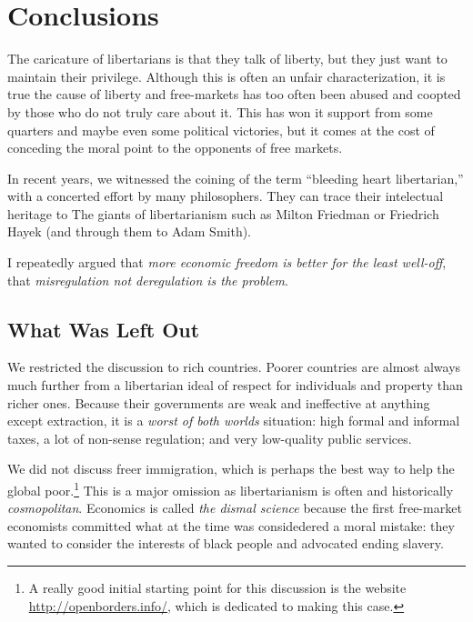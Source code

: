\chapter{Conclusions}

The caricature of libertarians is that they talk of liberty, but they just want
to maintain their privilege. Although this is often an unfair characterization,
it is true the cause of liberty and free-markets has too often been abused and
coopted by those who do not truly care about it. This has won it support from
some quarters and maybe even some political victories, but it comes at the cost
of conceding the moral point to the opponents of free markets.

In recent years, we witnessed the coining of the term ``bleeding heart
libertarian,'' with a concerted effort by many philosophers. They can trace
their intelectual heritage to The giants of libertarianism such as Milton
Friedman or Friedrich Hayek (and through them to Adam Smith).

I repeatedly argued that \emph{more economic freedom is better for the least
well-off}, that \emph{misregulation not deregulation is the problem}.

\section{What Was Left Out}

We restricted the discussion to rich countries. Poorer countries are almost
always much further from a libertarian ideal of respect for individuals and
property than richer ones. Because their governments are weak and ineffective
at anything except extraction, it is a \emph{worst of both worlds} situation:
high formal and informal taxes, a lot of non-sense regulation; and very
low-quality public services.

We did not discuss freer immigration, which is perhaps the best way to help the
global poor.\footnote{A really good initial starting point for this discussion
is the website \url{http://openborders.info/}, which is dedicated to making
this case.} This is a major omission as libertarianism is often and
historically \emph{cosmopolitan}. Economics is called \emph{the dismal science}
because the first free-market economists committed what at the time was
considedered a moral mistake: they wanted to consider the interests of black
people and advocated ending slavery.

